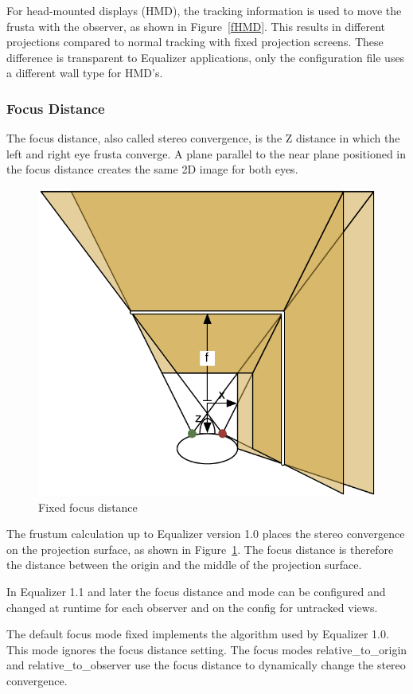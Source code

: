\documentclass[10pt,a4]{scrartcl}
\newcommand{\fig}[1]{Figure~\ref{#1}}
\begin{document}
For head-mounted displays (HMD), the tracking information is used to
move the frusta with the observer, as shown in \fig{fHMD}. This results
in different projections compared to normal tracking with fixed
projection screens. These difference is transparent to Equalizer applications,
only the configuration file uses a different wall type for HMD's.

\subsubsection{\label{sFocusDistance}Focus Distance}

The focus distance, also called stereo convergence, is the Z distance in which
the left and right eye frusta converge. A plane parallel to the near plane
positioned in the focus distance creates the same 2D image for both eyes.

\begin{figure}
  \includegraphics[width=.382\textwidth]{images/focusFixed}
  {\caption{\label{fFixed}Fixed focus distance}}
\end{figure}
The frustum calculation up to Equalizer version 1.0 places the stereo
convergence on the projection surface, as shown in \fig{fFixed}. The focus
distance is therefore the distance between the origin and the middle of the
projection surface.

In Equalizer 1.1 and later the focus distance and mode can be configured and
changed at runtime for each \textsf{observer} and on the \textsf{config} for
untracked views.

The default focus mode \textsf{fixed} implements the algorithm used by Equalizer
1.0. This mode ignores the focus distance setting. The focus modes
\textsf{relative\_to\_origin} and \textsf{relative\_to\_observer} use the focus
distance to dynamically change the stereo convergence.
\end{document}
